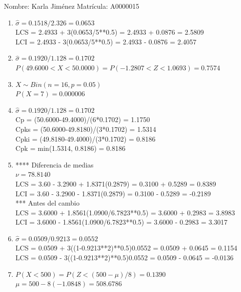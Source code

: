 \documentclass[8pt]{report}
\begin{document}
 \newpage

Nombre: \underline{\hspace*{.2in}}
Karla Jiménez
\underline{\hspace*{.2in}} \quad Matr\'icula:\underline{\hspace*{.2in}}
A0000015
\underline{\hspace*{.2in}} \\

\begin{enumerate}
\item $\hat\sigma = 0.1518/2.326 = 0.0653$\\
LCS = 2.4933 + 3(0.0653/5**0.5) = 2.4933 + 0.0876 = 2.5809\\
LCI = 2.4933 - 3(0.0653/5**0.5) = 2.4933 - 0.0876 = 2.4057
\item $\hat\sigma = 0.1920/1.128 = 0.1702$\\
$P(49.6000 < X < 50.0000) = P(-1.2807 < Z < 1.0693) = 0.7574$\\
\item $X \sim Bin(n=16, p=0.05)$\\
$P(X = 7) = 0.000006$
\item $\hat\sigma = 0.1920/1.128 = 0.1702$\\
Cp = (50.6000-49.4000)/(6*0.1702) = 1.1750\\
Cpks = (50.6000-49.8180)/(3*0.1702) = 1.5314\\
Cpki = (49.8180-49.4000)/(3*0.1702) = 0.8186\\
Cpk = min(1.5314, 0.8186) = 0.8186
\item **** Diferencia de medias\\
$\nu = 78.8140$\\
LCS = 3.60 - 3.2900 + 1.8371(0.2879) = 0.3100 + 0.5289 = 0.8389\\
LCI = 3.60 - 3.2900 - 1.8371(0.2879) = 0.3100 - 0.5289 = -0.2189\\
*** Antes del cambio\\
LCS = 3.6000 + 1.8561(1.0900/6.7823**0.5) = 3.6000 + 0.2983 = 3.8983\\
LCI = 3.6000 - 1.8561(1.0900/6.7823**0.5) = 3.6000 - 0.2983 = 3.3017\\
\item $\hat\sigma = 0.0509/0.9213 = 0.0552$\\
LCS = 0.0509 + 3((1-0.9213**2)**0.5)0.0552 = 0.0509 + 0.0645 = 0.1154\\
LCS = 0.0509 - 3((1-0.9213**2)**0.5)0.0552 = 0.0509 - 0.0645 = -0.0136
\item $P(X < 500) = P(Z < (500-\mu)/8) = 0.1390$\\
$\mu = 500 - 8(-1.0848) = 508.6786$\\
\end{enumerate}
\end{document}
